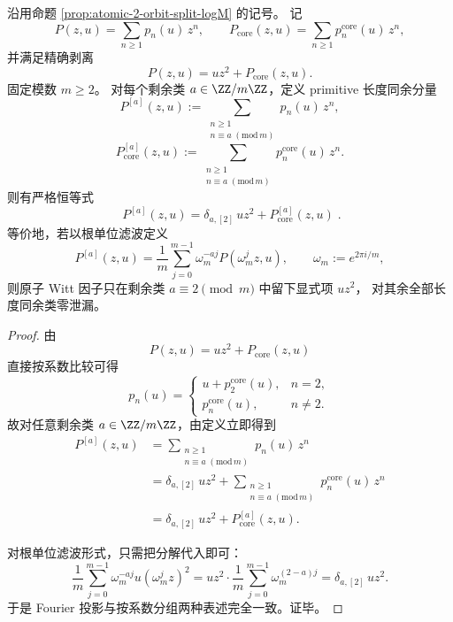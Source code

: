 \begin{theorem}\label{thm:xi-atomic-witt-mod-class-localization}
沿用命题 \ref{prop:atomic-2-orbit-split-logM} 的记号。
记
\[
P(z,u)=\sum_{n\ge 1}p_n(u)\,z^n,
\qquad
P_{\mathrm{core}}(z,u)=\sum_{n\ge 1}p_n^{\mathrm{core}}(u)\,z^n,
\]
并满足精确剥离
\[
P(z,u)=u z^2+P_{\mathrm{core}}(z,u).
\]
固定模数 \(m\ge 2\)。
对每个剩余类 \(a\in \ZZ/m\ZZ\)，定义 primitive 长度同余分量
\[
P^{[a]}(z,u)
:=
\sum_{\substack{n\ge 1\\ n\equiv a\;(\mathrm{mod}\,m)}}p_n(u)\,z^n,
\]
\[
P_{\mathrm{core}}^{[a]}(z,u)
:=
\sum_{\substack{n\ge 1\\ n\equiv a\;(\mathrm{mod}\,m)}}
p_n^{\mathrm{core}}(u)\,z^n.
\]
则有严格恒等式
\[
\boxed{\;
P^{[a]}(z,u)=\delta_{a,[2]}\,u z^2+P_{\mathrm{core}}^{[a]}(z,u)\; }.
\]
等价地，若以根单位滤波定义
\[
P^{[a]}(z,u)
=
\frac1m\sum_{j=0}^{m-1}\omega_m^{-aj}P(\omega_m^j z,u),
\qquad
\omega_m:=e^{2\pi i/m},
\]
则原子 Witt 因子只在剩余类 \(a\equiv 2\pmod m\) 中留下显式项 \(u z^2\)，
对其余全部长度同余类零泄漏。
\end{theorem}
\begin{proof}
由
\[
P(z,u)=u z^2+P_{\mathrm{core}}(z,u)
\]
直接按系数比较可得
\[
p_n(u)=
\begin{cases}
u+p_2^{\mathrm{core}}(u),& n=2,\\[2mm]
p_n^{\mathrm{core}}(u),& n\neq 2.
\end{cases}
\]
故对任意剩余类 \(a\in\ZZ/m\ZZ\)，由定义立即得到
\[
\begin{aligned}
P^{[a]}(z,u)
&=
\sum_{\substack{n\ge 1\\ n\equiv a\;(\mathrm{mod}\,m)}}p_n(u)\,z^n\\
&=
\delta_{a,[2]}\,u z^2
+\sum_{\substack{n\ge 1\\ n\equiv a\;(\mathrm{mod}\,m)}}
p_n^{\mathrm{core}}(u)\,z^n\\
&=
\delta_{a,[2]}\,u z^2+P_{\mathrm{core}}^{[a]}(z,u).
\end{aligned}
\]
\par
对根单位滤波形式，只需把分解代入即可：
\[
\frac1m\sum_{j=0}^{m-1}\omega_m^{-aj}u(\omega_m^j z)^2
=
u z^2\cdot
\frac1m\sum_{j=0}^{m-1}\omega_m^{(2-a)j}
=
\delta_{a,[2]}\,u z^2.
\]
于是 Fourier 投影与按系数分组两种表述完全一致。证毕。
\end{proof}

